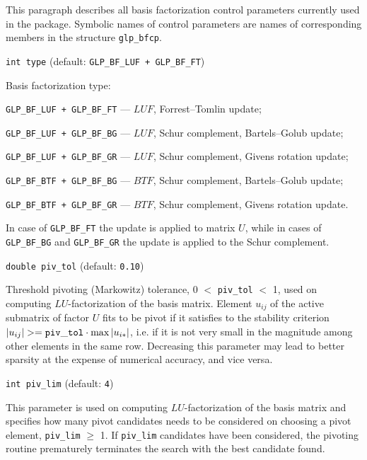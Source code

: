 
This paragraph describes all basis factorization control parameters
currently used in the package. Symbolic names of control parameters are
names of corresponding members in the structure \verb|glp_bfcp|.

\medskip

{\tt int type} (default: {\tt GLP\_BF\_LUF + GLP\_BF\_FT})

Basis factorization type:

\verb~GLP_BF_LUF + GLP_BF_FT~ --- $LUF$, Forrest--Tomlin update;

\verb~GLP_BF_LUF + GLP_BF_BG~ --- $LUF$, Schur complement,
Bartels--Golub update;

\verb~GLP_BF_LUF + GLP_BF_GR~ --- $LUF$, Schur complement,
Givens rotation update;

\verb~GLP_BF_BTF + GLP_BF_BG~ --- $BTF$, Schur complement,
Bartels--Golub update;

\verb~GLP_BF_BTF + GLP_BF_GR~ --- $BTF$, Schur complement,
Givens rotation update.

In case of \verb|GLP_BF_FT| the update is applied to matrix $U$, while
in cases of \verb|GLP_BF_BG| and \verb|GLP_BF_GR| the update is applied
to the Schur complement.

%
%

\medskip

{\tt double piv\_tol} (default: {\tt 0.10})

Threshold pivoting (Markowitz) tolerance, 0 $<$ \verb|piv_tol| $<$ 1,
used on computing $LU$-factoriza\-tion of the basis matrix. Element
$u_{ij}$ of the active submatrix of factor $U$ fits to be pivot if it
satisfies to the stability criterion
$|u_{ij}| >= {\tt piv\_tol}\cdot\max|u_{i*}|$, i.e. if it is not very
small in the magnitude among other elements in the same row. Decreasing
this parameter may lead to better sparsity at the expense of numerical
accuracy, and vice versa.

\medskip

{\tt int piv\_lim} (default: {\tt 4})

This parameter is used on computing $LU$-factorization of the basis
matrix and specifies how many pivot candidates needs to be considered
on choosing a pivot element, \verb|piv_lim| $\geq$ 1. If \verb|piv_lim|
candidates have been considered, the pivoting routine prematurely
terminates the search with the best candidate found.

